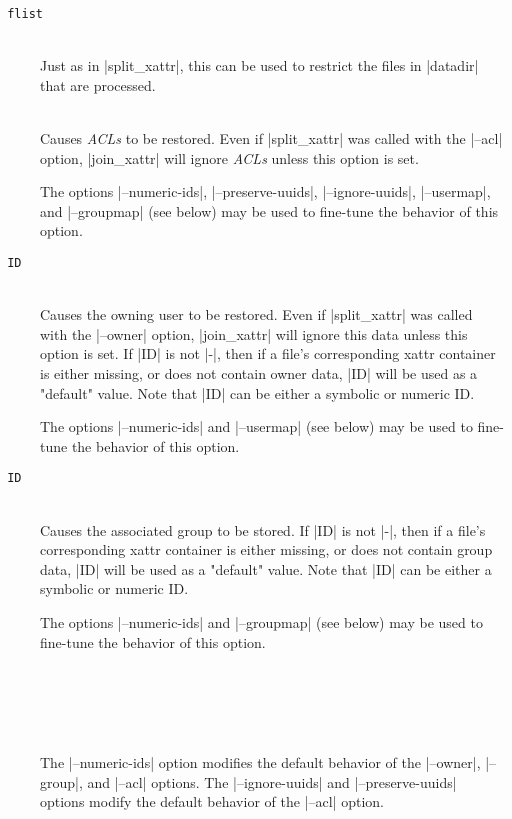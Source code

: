 \documentclass[11pt]{article}
\begin{document}
\begin{description}


\item[{\tt {} flist}] \ \\
Just as in |split_xattr|, this can be used to restrict 
the files in |datadir| that are processed.


\item[{\tt{}}] \ \\
Causes \emph{ACLs} to be restored.
Even if |split_xattr| was called with the |--acl| option,
|join_xattr| will ignore \emph{ACLs} unless this option is set.

The options |--numeric-ids|, |--preserve-uuids|, |--ignore-uuids|,
|--usermap|, and |--groupmap| (see below) may be used to 
fine-tune the behavior of this option.


\item[{\tt{} ID}] \ \\
Causes the owning user to be restored.
Even if |split_xattr| was called with the |--owner| option,
|join_xattr| will ignore this data unless this option is set.
If |ID| is not |-|, then if a file's corresponding xattr
container is either missing, or does not contain owner data,
|ID| will be used as a "default" value.
Note that |ID| can be either a symbolic or numeric ID.

The options |--numeric-ids| and |--usermap| (see below) 
may be used to fine-tune the behavior
of this option.



\item[{\tt{} ID}] \ \\
Causes the associated group to be stored.
If |ID| is not |-|, then if a file's corresponding xattr
container is either missing, or does not contain group data,
|ID| will be used as a "default" value.
Note that |ID| can be either a symbolic or numeric ID.

The options |--numeric-ids| and |--groupmap| (see below) 
may be used to fine-tune the behavior
of this option.

\item[{\tt {}}] \ \\[-3ex]
\item[{\tt {}}] \ \\[-3ex]
\item[{\tt {}}] \ \\
The |--numeric-ids| option modifies the default behavior of
the |--owner|, |--group|, and |--acl| options.
The |--ignore-uuids| and |--preserve-uuids| options modify
the default behavior of the |--acl| option.


\end{description}
\end{document}
